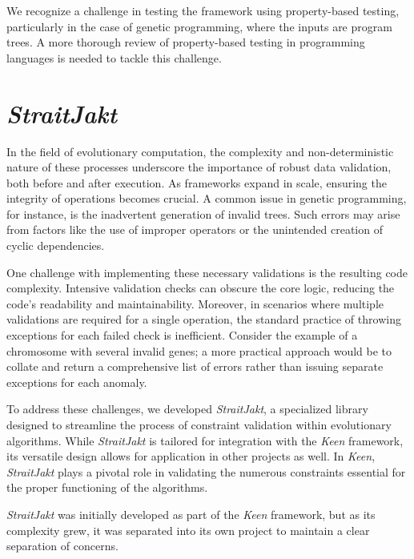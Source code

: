         We recognize a challenge in testing the framework using property-based testing, particularly in the case of
        genetic programming, where the inputs are program trees. A more thorough review of property-based testing in
        programming languages is needed to tackle this challenge.

    \section{\textit{StraitJakt}}
        In the field of evolutionary computation, the complexity and non-deterministic nature of these processes 
        underscore the importance of robust data validation, both before and after execution. As frameworks expand in 
        scale, ensuring the integrity of operations becomes crucial. A common issue in genetic programming, for 
        instance, is the inadvertent generation of invalid trees. Such errors may arise from factors like the use of 
        improper operators or the unintended creation of cyclic dependencies.

        One challenge with implementing these necessary validations is the resulting code complexity. Intensive 
        validation checks can obscure the core logic, reducing the code's readability and maintainability. Moreover, in 
        scenarios where multiple validations are required for a single operation, the standard practice of throwing 
        exceptions for each failed check is inefficient. Consider the example of a chromosome with several invalid 
        genes; a more practical approach would be to collate and return a comprehensive list of errors rather than 
        issuing separate exceptions for each anomaly.

        To address these challenges, we developed \textit{StraitJakt}, a specialized library designed to streamline the 
        process of constraint validation within evolutionary algorithms. While \textit{StraitJakt} is tailored for 
        integration with the \textit{Keen} framework, its versatile design allows for application in other projects as 
        well. In \textit{Keen}, \textit{StraitJakt} plays a pivotal role in validating the numerous constraints 
        essential for the proper functioning of the algorithms.

        \textit{StraitJakt} was initially developed as part of the \textit{Keen} framework, but as its complexity grew,
        it was separated into its own project to maintain a clear separation of concerns.

